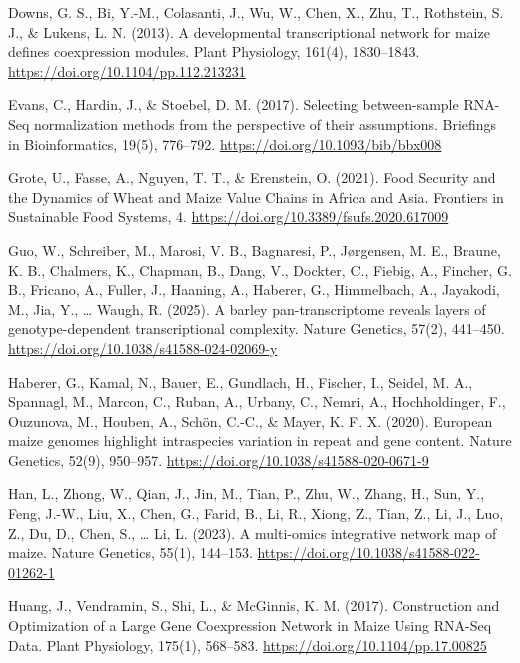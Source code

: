 \documentclass[
]{article}
\begin{document}
Downs, G. S., Bi, Y.-M., Colasanti, J., Wu, W., Chen, X., Zhu, T.,
Rothstein, S. J., \& Lukens, L. N. (2013). A developmental
transcriptional network for maize defines coexpression modules. Plant
Physiology, 161(4), 1830--1843.
\href{https://doi.org/10.1104/pp.112.213231}{{https://doi.org/10.1104/pp.112.213231}}

Evans, C., Hardin, J., \& Stoebel, D. M. (2017). Selecting
between-sample RNA-Seq normalization methods from the perspective of
their assumptions. Briefings in Bioinformatics, 19(5), 776--792.
\href{https://doi.org/10.1093/bib/bbx008}{{https://doi.org/10.1093/bib/bbx008}}

Grote, U., Fasse, A., Nguyen, T. T., \& Erenstein, O. (2021). Food
Security and the Dynamics of Wheat and Maize Value Chains in Africa and
Asia. Frontiers in Sustainable Food Systems, 4.
\href{https://doi.org/10.3389/fsufs.2020.617009}{{https://doi.org/10.3389/fsufs.2020.617009}}

Guo, W., Schreiber, M., Marosi, V. B., Bagnaresi, P., Jørgensen, M. E.,
Braune, K. B., Chalmers, K., Chapman, B., Dang, V., Dockter, C., Fiebig,
A., Fincher, G. B., Fricano, A., Fuller, J., Haaning, A., Haberer, G.,
Himmelbach, A., Jayakodi, M., Jia, Y., \ldots{} Waugh, R. (2025). A
barley pan-transcriptome reveals layers of genotype-dependent
transcriptional complexity. Nature Genetics, 57(2), 441--450.
\href{https://doi.org/10.1038/s41588-024-02069-y}{{https://doi.org/10.1038/s41588-024-02069-y}}

Haberer, G., Kamal, N., Bauer, E., Gundlach, H., Fischer, I., Seidel, M.
A., Spannagl, M., Marcon, C., Ruban, A., Urbany, C., Nemri, A.,
Hochholdinger, F., Ouzunova, M., Houben, A., Schön, C.-C., \& Mayer, K.
F. X. (2020). European maize genomes highlight intraspecies variation in
repeat and gene content. Nature Genetics, 52(9), 950--957.
\href{https://doi.org/10.1038/s41588-020-0671-9}{{https://doi.org/10.1038/s41588-020-0671-9}}

Han, L., Zhong, W., Qian, J., Jin, M., Tian, P., Zhu, W., Zhang, H.,
Sun, Y., Feng, J.-W., Liu, X., Chen, G., Farid, B., Li, R., Xiong, Z.,
Tian, Z., Li, J., Luo, Z., Du, D., Chen, S., \ldots{} Li, L. (2023). A
multi-omics integrative network map of maize. Nature Genetics, 55(1),
144--153.
\href{https://doi.org/10.1038/s41588-022-01262-1}{{https://doi.org/10.1038/s41588-022-01262-1}}

Huang, J., Vendramin, S., Shi, L., \& McGinnis, K. M. (2017).
Construction and Optimization of a Large Gene Coexpression Network in
Maize Using RNA-Seq Data. Plant Physiology, 175(1), 568--583.
\href{https://doi.org/10.1104/pp.17.00825}{{https://doi.org/10.1104/pp.17.00825}}
\end{document}
